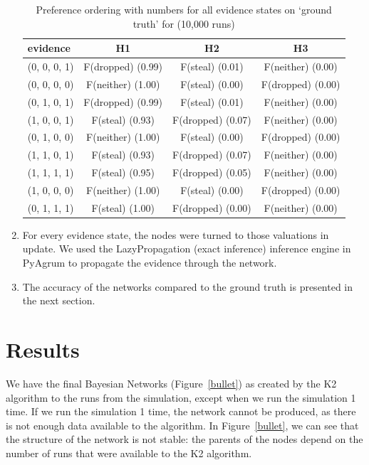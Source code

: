 \documentclass[12pt]{article}
\begin{document}
\begin{enumerate}
\begin{table}[htbp]
\begin{center}
\begin{tabular}{|l|c|c|c|}
\hline
evidence & H1 & H2 & H3 \\
\hline
(0, 0, 0, 1)&F(dropped) (0.99) & F(steal) (0.01) & F(neither) (0.00) \\
(0, 0, 0, 0)&F(neither) (1.00) & F(steal) (0.00) & F(dropped) (0.00) \\
(0, 1, 0, 1)&F(dropped) (0.99) & F(steal) (0.01) & F(neither) (0.00) \\
(1, 0, 0, 1)&F(steal) (0.93) & F(dropped) (0.07) & F(neither) (0.00) \\
(0, 1, 0, 0)&F(neither) (1.00) & F(steal) (0.00) & F(dropped) (0.00) \\
(1, 1, 0, 1)&F(steal) (0.93) & F(dropped) (0.07) & F(neither) (0.00) \\
(1, 1, 1, 1)&F(steal) (0.95) & F(dropped) (0.05) & F(neither) (0.00) \\
(1, 0, 0, 0)&F(neither) (1.00) & F(steal) (0.00) & F(dropped) (0.00) \\
(0, 1, 1, 1)&F(steal) (1.00) & F(dropped) (0.00) & F(neither) (0.00) \\
\hline
\end{tabular}
\end{center}
\caption{Preference ordering with numbers for all evidence states on `ground truth' for (10,000 runs)}
\label{heretic}
\end{table}

\item For every evidence state, the nodes were turned to those valuations in update. We used the LazyPropagation (exact inference) inference engine in PyAgrum to propagate the evidence through the network.

\item The accuracy of the networks compared to the ground truth is presented in the next section.

\end{enumerate}



\section{Results}


We have the final Bayesian Networks (Figure~\ref{bullet}) as created by the K2 algorithm to the runs from the simulation, except when we run the simulation 1 time. If we run the simulation 1 time, the network cannot be produced, as there is not enough data available to the algorithm. In Figure~\ref{bullet}, we can see that the structure of the network is not stable: the parents of the nodes depend on the number of runs that were available to the K2 algorithm.
\end{document}
